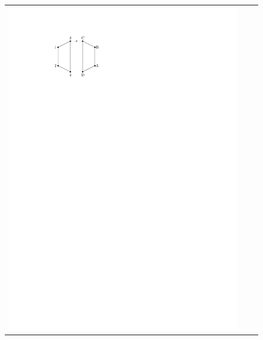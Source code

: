 \documentclass[11pt]{patmorin}
\begin{document}
\begin{figure}[hb]
{\begin{tabular}{ccc}
      \includegraphics{img/bad-example-1} & 

\end{tabular}}
\end{figure}
\end{document}
